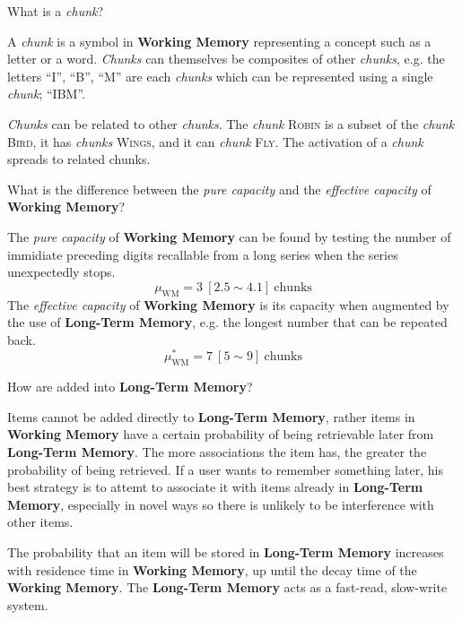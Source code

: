 \begin{flashcard}[Question]{What is a \textit{chunk}?}
\begin{center}
A \textit{chunk} is a symbol in \textbf{Working Memory} representing a concept such as a letter or a word. \textit{Chunks} can themselves be composites of other \textit{chunks}, e.g. the letters ``I'', ``B'', ``M'' are each \textit{chunks} which can be represented using a single \textit{chunk}; ``IBM''.

\medskip

\textit{Chunks} can be related to other \textit{chunks}. The \textit{chunk} \textsc{Robin} is a subset of the \textit{chunk} \textsc{Bird}, it has \textit{chunks} \textsc{Wings}, and it can \textit{chunk} \textsc{Fly}. The activation of a \textit{chunk} spreads to related chunks.
\end{center}
\end{flashcard}

\begin{flashcard}[Question]{What is the difference between the \textit{pure capacity} and the \textit{effective capacity} of \textbf{Working Memory}?}
\begin{center}
The \textit{pure capacity} of \textbf{Working Memory} can be found by testing the number of immidiate preceding digits recallable from a long series when the series unexpectedly stops.
\begin{displaymath}
\mu_\text{WM} = 3~[2.5 \sim 4.1]~\text{chunks}
\end{displaymath}
The \textit{effective capacity} of \textbf{Working Memory} is its capacity when augmented by the use of \textbf{Long-Term Memory}, e.g. the longest number that can be repeated back.
\begin{displaymath}
\mu_\text{WM}^* = 7~[5 \sim 9]~\text{chunks}
\end{displaymath}
\end{center}
\end{flashcard}

\begin{flashcard}[Question]{How are added into \textbf{Long-Term Memory}?}
\begin{center}
Items cannot be added directly to \textbf{Long-Term Memory}, rather items in \textbf{Working Memory} have a certain probability of being retrievable later from \textbf{Long-Term Memory}. The more associations the item has, the greater the probability of being retrieved. If a user wants to remember something later, his best strategy is to attemt to associate it with items already in \textbf{Long-Term Memory}, especially in novel ways so there is unlikely to be interference with other items.

\medskip

The probability that an item will be stored in \textbf{Long-Term Memory} increases with residence time in \textbf{Working Memory}, up until the decay time of the \textbf{Working Memory}. The \textbf{Long-Term Memory} acts as a fast-read, slow-write system.
\end{center}
\end{flashcard}

